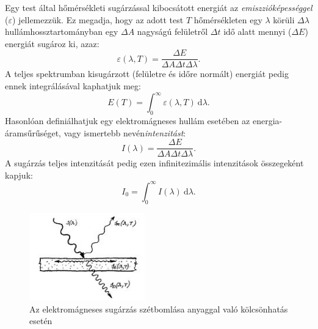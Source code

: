 \documentclass[a4paper, 12pt]{article}
\begin{document}
    Egy test által hőmérsékleti sugárzással kibocsátott energiát az \textit{emiszzióképességgel} ($\varepsilon$) jellemezzük.
    Ez megadja, hogy az adott test $T$ hőmérsékleten egy $\lambda$ körüli $\Delta\lambda$ hullámhossztartományban egy $\Delta A$ nagyságú felületről $\Delta t$ idő alatt mennyi ($\Delta E$) energiát sugároz ki, azaz:
    \begin{equation}
        \varepsilon(\lambda, T)=\frac{\Delta E}{\Delta A\Delta t\Delta\lambda}.\label{eq:0eps}
    \end{equation}
    A teljes spektrumban kisugárzott (felületre és időre normált) energiát pedig ennek integrálásával kaphatjuk meg:
    \begin{equation}
        E(T)=\int_{0}^{\infty} \varepsilon(\lambda, T)~\mathrm{d}\lambda.\label{eq:0E}
    \end{equation}
    Hasonlóan definiálhatjuk egy elektromágneses hullám esetében az energia-áramsűrűséget, vagy ismertebb nevén\textit{intenzitást}:
    \begin{equation}
        I(\lambda)=\frac{\Delta E}{\Delta A\Delta t\Delta\lambda}.\label{eq:0I}
    \end{equation}
    A sugárzás teljes intenzitását pedig ezen infinitezimális intenzitások összegeként kapjuk:
    \begin{equation}
        I_0=\int_{0}^{\infty} I(\lambda)~\mathrm{d}\lambda.\label{eq:0I0}
    \end{equation}
    \begin{figure}[H]
        \centering
        \includegraphics[width=5cm]{200px-Fenytores_homsug}
        \caption{Az elektromágneses sugárzás szétbomlása anyaggal való kölcsönhatás esetén \cite{leir}}
        \label{fig:0em}
    \end{figure}
\end{document}
